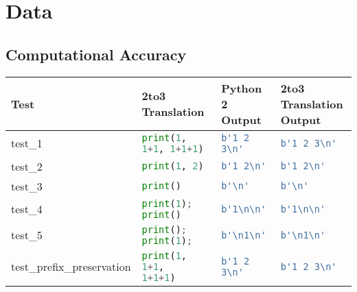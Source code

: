 \section{Data}
\label{appendix:Data}
\subsection{Computational Accuracy}
\begin{table}[ht]
    \centering
    \begin{tabular}{|l|l|l|l|}
    \hline
    Test                                  & 2to3 Translation                      & Python 2 Output                               & 2to3 Translation Output                       \\ \hline
    test\_1                               & \lstinline[language=Python, style=pythonstyle]|print(1, 1+1, 1+1+1)                 | & \lstinline[language=Python, style=pythonstyle]|b'1 2 3\n'             | & \lstinline[language=Python, style=pythonstyle]|b'1 2 3\n'             | \\ \hline
    test\_2                               & \lstinline[language=Python, style=pythonstyle]|print(1, 2)                          | & \lstinline[language=Python, style=pythonstyle]|b'1 2\n'               | & \lstinline[language=Python, style=pythonstyle]|b'1 2\n'               | \\ \hline
    test\_3                               & \lstinline[language=Python, style=pythonstyle]|print()                              | & \lstinline[language=Python, style=pythonstyle]|b'\n'                  | & \lstinline[language=Python, style=pythonstyle]|b'\n'                  | \\ \hline
    test\_4                               & \lstinline[language=Python, style=pythonstyle]|print(1); print()                    | & \lstinline[language=Python, style=pythonstyle]|b'1\n\n'| & \lstinline[language=Python, style=pythonstyle]|b'1\n\n'| \\ \hline
    test\_5                               & \lstinline[language=Python, style=pythonstyle]|print(); print(1);                   | & \lstinline[language=Python, style=pythonstyle]|b'\n1\n'| & \lstinline[language=Python, style=pythonstyle]|b'\n1\n'| \\ \hline
    test\_prefix\_preservation            & \lstinline[language=Python, style=pythonstyle]|print(1,   1+1,   1+1+1)             | & \lstinline[language=Python, style=pythonstyle]|b'1 2 3\n'             | & \lstinline[language=Python, style=pythonstyle]|b'1 2 3\n'             | \\ \hline

\end{tabular}
\end{table}
